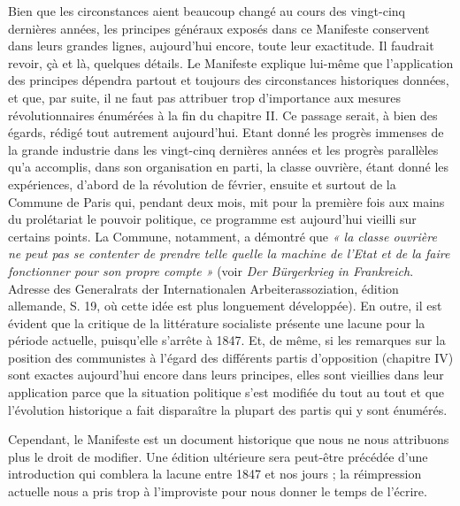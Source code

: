\documentclass[french,twoside]{book} %
\newcommand{\byline}[1]{\bigskip{\RaggedLeft{#1}\par}\bigskip}
\begin{document}
Bien que les circonstances aient beaucoup changé au cours des vingt-cinq dernières années, les principes généraux exposés dans ce Manifeste conservent dans leurs grandes lignes, aujourd’hui encore, toute leur exactitude. Il faudrait revoir, çà et là, quelques détails. Le Manifeste explique lui-même que l’application des principes dépendra partout et toujours des circonstances historiques données, et que, par suite, il ne faut pas attribuer trop d’importance aux mesures révolutionnaires énumérées à la fin du chapitre II. Ce passage serait, à bien des égards, rédigé tout autrement aujourd’hui. Etant donné les progrès immenses de la grande industrie dans les vingt-cinq dernières années et les progrès parallèles qu’a accomplis, dans son organisation en parti, la classe ouvrière, étant donné les expériences, d’abord de la révolution de février, ensuite et surtout de la Commune de Paris qui, pendant deux mois, mit pour la première fois aux mains du prolétariat le pouvoir politique, ce programme est aujourd’hui vieilli sur certains points. La Commune, notamment, a démontré que \emph{« la classe ouvrière ne peut pas se contenter de prendre telle quelle la machine de l’Etat et de la faire fonctionner pour son propre compte »} (voir \emph{Der Bürgerkrieg in Frankreich}. Adresse des Generalrats der Internationalen Arbeiterassoziation, édition allemande, S. 19, où cette idée est plus longuement développée). En outre, il est évident que la critique de la littérature socialiste présente une lacune pour la période actuelle, puisqu’elle s’arrête à 1847. Et, de même, si les remarques sur la position des communistes à l’égard des différents partis d’opposition (chapitre IV) sont exactes aujourd’hui encore dans leurs principes, elles sont vieillies dans leur application parce que la situation politique s’est modifiée du tout au tout et que l’évolution historique a fait disparaître la plupart des partis qui y sont énumérés.\par
Cependant, le Manifeste est un document historique que nous ne nous attribuons plus le droit de modifier. Une édition ultérieure sera peut-être précédée d’une introduction qui comblera la lacune entre 1847 et nos jours ; la réimpression actuelle nous a pris trop à l’improviste pour nous donner le temps de l’écrire.\par

\byline{Karl Marx, Friedrich Engels ; \\
Londres, 24 juin 1872}
\end{document}
